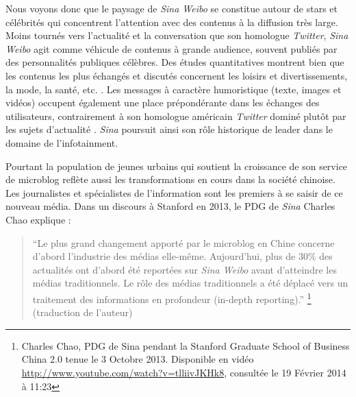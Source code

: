 Nous voyons donc que le paysage de \textit{Sina Weibo} se constitue autour de stars et célébrités qui concentrent l’attention avec des contenus à la diffusion très large. Moins tournés vers l’actualité et la conversation que son homologue \textit{Twitter}, \textit{Sina Weibo} agit comme véhicule de contenus à grande audience, souvent publiés par des personnalités publiques célèbres. Des études quantitatives montrent bien que les contenus les plus échangés et discutés concernent les loisirs et divertissements, la mode, la santé, etc. \citep{Li2013}. Les messages à caractère humoristique (texte, images et vidéos) occupent également une place prépondérante dans les échanges des utilisateurs, contrairement à son homologue américain \textit{Twitter} dominé plutôt par les sujets d’actualité \citep{Yu2011}. \textit{Sina} poursuit ainsi son rôle historique de leader dans le domaine de l’infotainment. 

Pourtant la population de jeunes urbains qui soutient la croissance de son service de microblog reflète aussi les transformations en cours dans la société chinoise. Les journalistes et spécialistes de l’information sont les premiers à se saisir de ce nouveau média. Dans un discours à Stanford en 2013, le PDG de \textit{Sina} Charles Chao explique : 

\begin{quote}
“Le plus grand changement apporté par le microblog en Chine concerne d’abord l’industrie des médias elle-même. Aujourd’hui, plus de 30\% des actualités ont d’abord été reportées sur \textit{Sina Weibo} avant d’atteindre les médias 	traditionnels. Le rôle des médias traditionnels a été déplacé vers un traitement des informations en profondeur (in-depth reporting).” \footnote {Charles Chao, PDG de Sina pendant la Stanford Graduate School of Business China 2.0 tenue le 3 Octobre 2013. Disponible en vidéo \url{http://www.youtube.com/watch?v=tlliivJKHk8}, consultée le 19 Février 2014 à 11:23} (traduction de l’auteur)
\end{quote}

